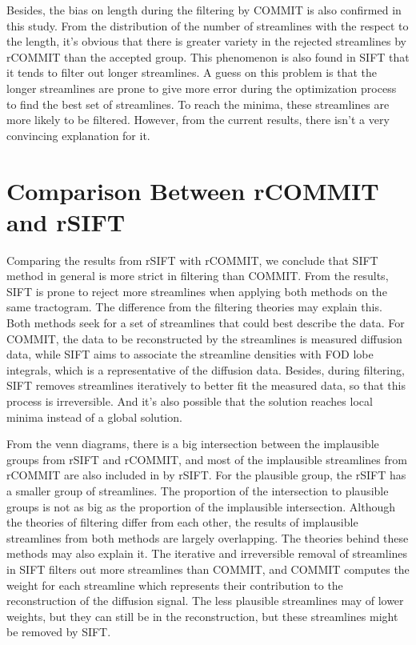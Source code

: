 Besides, the bias on length during the filtering by COMMIT is also confirmed in this study.
From the distribution of the number of streamlines with the respect to the length, it's obvious that 
there is greater variety in the rejected streamlines by rCOMMIT than the accepted group. 
This phenomenon is also found in SIFT that it tends to filter out longer streamlines.
A guess on this problem is that the longer streamlines are prone to give more error during the optimization process
to find the best set of streamlines. To reach the minima, these streamlines are more likely to be filtered. 
However, from the current results, there isn't a very convincing explanation for it. 

\section{Comparison Between rCOMMIT and rSIFT}

Comparing the results from rSIFT with rCOMMIT, we conclude that SIFT method in general is more strict in filtering than COMMIT. From the results, SIFT 
is prone to reject more streamlines when applying both methods on the same tractogram.  
The difference from the filtering theories may explain this. 
Both methods seek for a set of streamlines that could best describe the data. For COMMIT, the data to be reconstructed by the streamlines is measured diffusion data, while 
SIFT aims to associate the streamline densities with FOD lobe integrals, which is a representative of the diffusion data. Besides,
during filtering, SIFT removes streamlines iteratively to better fit the measured data, so that this process is irreversible. And it's 
also possible that the solution reaches local minima instead of a global solution.


From the venn diagrams, there is a big intersection between the implausible groups from rSIFT and rCOMMIT, 
and most of the implausible streamlines from rCOMMIT are also included in by rSIFT. For the plausible 
group, the rSIFT has a smaller group of streamlines. The proportion of the intersection to plausible groups is not 
as big as the proportion of the implausible intersection. Although the theories of filtering differ from each other,
the results of implausible streamlines from both methods are largely overlapping. 
The theories behind these methods may also explain it. The iterative and irreversible removal of streamlines in SIFT filters out more streamlines than COMMIT,
and COMMIT computes the weight for each streamline which represents their contribution to the reconstruction of the diffusion signal. 
The less plausible streamlines may of lower weights, but they can still be in the reconstruction, but these streamlines might be removed by SIFT.


